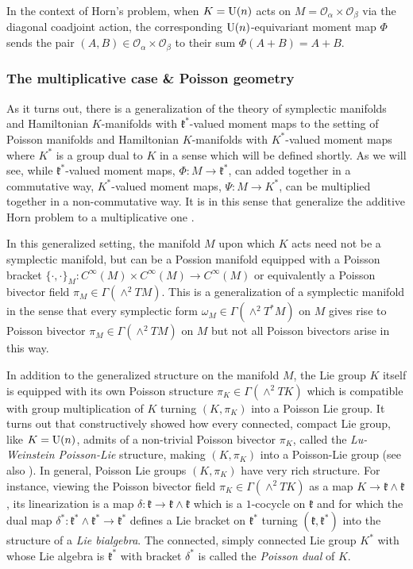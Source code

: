 \documentclass[notitlepage]{article}
\begin{document}
In the context of Horn's problem, when $K = \operatorname{U}(n)$ acts on $M = \mathcal O_{\alpha} \times \mathcal O_{\beta}$ via the diagonal coadjoint action, the corresponding $\operatorname{U}(n)$-equivariant moment map $\Phi$ sends the pair $(A, B) \in \mathcal O_{\alpha} \times \mathcal O_{\beta}$ to their sum $\Phi(A+B) = A + B$.

\subsubsection{The multiplicative case \& Poisson geometry}

As it turns out, there is a generalization of the theory of symplectic manifolds and Hamiltonian $K$-manifolds with $\mathfrak k^{*}$-valued moment maps to the setting of Poisson manifolds and Hamiltonian $K$-manifolds with $K^{*}$-valued moment maps where $K^{*}$ is a group dual to $K$ in a sense which will be defined shortly.
As we will see, while $\mathfrak k^{*}$-valued moment maps, $\Phi : M \to \mathfrak k^{*}$, can added together in a commutative way, $K^{*}$-valued moment maps, $\Psi : M \to K^{*}$, can be multiplied together in a non-commutative way.
It is in this sense that \citeauthor{alekseev2001linearization} generalize the additive Horn problem to a multiplicative one \cite{alekseev2001linearization}.

In this generalized setting, the manifold $M$ upon which $K$ acts need not be a symplectic manifold, but can be a Possion manifold equipped with a Poisson bracket $\{\cdot, \cdot\}_M : C^{\infty}(M) \times C^{\infty}(M) \to C^{\infty}(M)$ or equivalently a Poisson bivector field $\pi_M \in \Gamma(\wedge^{2} TM)$.
This is a generalization of a symplectic manifold in the sense that every symplectic form $\omega_M \in \Gamma(\wedge^{2}T^{*}M)$ on $M$ gives rise to Poisson bivector $\pi_M \in \Gamma(\wedge^2 TM)$ on $M$ but not all Poisson bivectors arise in this way.

In addition to the generalized structure on the manifold $M$, the Lie group $K$ itself is equipped with its own Poisson structure $\pi_K \in \Gamma(\wedge^{2} T K)$ which is compatible with group multiplication of $K$ turning $(K, \pi_K)$ into a Poisson Lie group. 
It turns out that \citeauthor{lu1990poisson} constructively showed how every connected, compact Lie group, like $K = \operatorname{U}(n)$, admits of a non-trivial Poisson bivector $\pi_K$, called the \textit{Lu-Weinstein Poisson-Lie} structure, making $(K, \pi_K)$ into a Poisson-Lie group \cite{lu1990poisson} (see also \cite{levendorskii1991algebras}).
In general, Poisson Lie groups $(K, \pi_K)$ have very rich structure.
For instance, viewing the Poisson bivector field $\pi_K \in \Gamma(\wedge^{2} T K)$ as a map $K \to \mathfrak k \wedge \mathfrak k$, its linearization is a map $\delta : \mathfrak k \to \mathfrak k \wedge \mathfrak k$ which is a $1$-cocycle on $\mathfrak k$ and for which the dual map $\delta^{*} : \mathfrak k^{*} \wedge \mathfrak k^{*} \to \mathfrak k^{*}$ defines a Lie bracket on $\mathfrak k^{*}$ turning $(\mathfrak k, \mathfrak k^{*})$ into the structure of a \textit{Lie bialgebra}.
The connected, simply connected Lie group $K^{*}$ with whose Lie algebra is $\mathfrak k^{*}$ with bracket $\delta^{*}$ is called the \textit{Poisson dual} of $K$.
\end{document}

